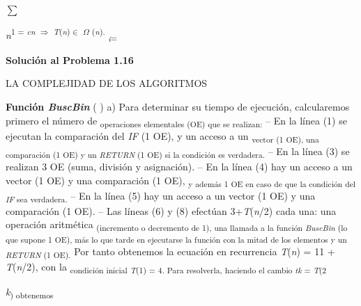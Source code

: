 \documentclass[12pt]{article}
\renewcommand{\_}{\kern-1.5pt\textunderscore\kern-1.5pt}
\begin{document}
{\fontsize{18pt}{21.6pt}\selectfont $ \sum $ {\fontsize{7pt}{8.4pt}\selectfont \textit{n}\textsuperscript{1 = \textit{cn }$ \Rightarrow $  \textit{T}(\textit{n})$ \in $ $ \Omega $ (\textit{n}). }\textit{\textsubscript{i}}\textsubscript{=}{\fontsize{6pt}{7.2pt}\par}\par}\par}\par

{\fontsize{10pt}{12.0pt}\selectfont \textbf{Solución al Problema 1.16 }\par}\par

\begin{adjustwidth}{0.58in}{0.57in}
{\fontsize{7pt}{8.4pt}\selectfont LA COMPLEJIDAD DE LOS ALGORITMOS {\fontsize{10pt}{12.0pt} \par}\par}\par

\end{adjustwidth}

\begin{adjustwidth}{0.58in}{0.57in}
{\fontsize{10pt}{12.0pt}\selectfont \textbf{Función \textit{BuscBin }}( ) a) Para determinar su tiempo de ejecución, calcularemos primero el número de \textsubscript{operaciones elementales (OE) que se realizan: }– En la línea (1) se ejecutan la comparación del \textit{IF }(1 OE), y un acceso a un \textsubscript{vector (1 OE), una comparación (1 OE) y un \textit{RETURN }(1 OE) si la condición es verdadera. }– En la línea (3) se realizan 3 OE (suma, división y asignación). – En la línea (4) hay un acceso a un vector (1 OE) y una comparación (1 OE), \textsubscript{y además 1 OE en caso de que la condición del \textit{IF }sea verdadera. }– En la línea (5) hay un acceso a un vector (1 OE) y una comparación (1 OE). – Las líneas (6) y (8) efectúan 3+\textit{T}(\textit{n}/2) cada una: una operación aritmética \textsubscript{(incremento o decremento de 1), una llamada a la función \textit{BuscBin }(lo que supone 1 OE), más lo que tarde en ejecutarse la función con la mitad de los elementos y un \textit{RETURN }(1 OE). }Por tanto obtenemos la ecuación en recurrencia \textit{T}(\textit{n}) = 11 + \textit{T}(\textit{n}/2), con la \textsubscript{condición inicial \textit{T}(1) = 4. Para resolverla, haciendo el cambio \textit{tk }= \textit{T}(2}{\fontsize{7pt}{8.4pt}\selectfont \textit{k}\textsubscript{) obtenemos }\par}\par}\par

\end{adjustwidth}
\end{document}
